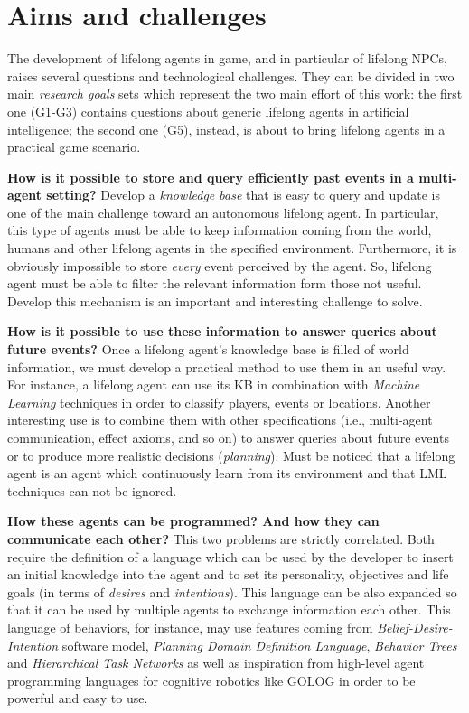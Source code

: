 \section{Aims and challenges}

The development of lifelong agents in game, and in particular of lifelong NPCs, raises several questions and technological challenges. They can be divided in two main \emph{research goals} sets which represent the two main effort of this work: the first one (G1-G3) contains questions about generic lifelong agents in artificial intelligence; the second one (G5), instead, is about to bring lifelong agents in a practical game scenario.

\begin{goals}
\item \textbf{How is it possible to store and query efficiently past events in a multi-agent setting?} Develop a \emph{knowledge base} that is easy to query and update is one of the main challenge toward an autonomous lifelong agent. In particular, this type of agents must be able to keep information coming from the world, humans and other lifelong agents in the specified environment. %
%
Furthermore, it is obviously impossible to store \emph{every} event perceived by the agent. So, lifelong agent must be able to filter the relevant information form those not useful. Develop this mechanism is an important and interesting challenge to solve.
%
% 
\item \textbf{How is it possible to use these information to answer queries about future events?} Once a lifelong agent's knowledge base is filled of world information, we must develop a practical method to use them in an useful way. For instance, a lifelong agent can use its KB in combination with \emph{Machine Learning} techniques in order to classify players, events or locations. Another interesting use is to combine them with other specifications (i.e., multi-agent communication, effect axioms, and so on) to answer queries about future events or to produce more realistic decisions (\emph{planning}). Must be noticed that a lifelong agent is an agent which continuously learn from its environment and that LML techniques can not be ignored. 
%
\item \textbf{How these agents can be programmed? And how they can communicate each other?} This two problems are strictly correlated. Both require the definition of a language which can be used by the developer to insert an initial knowledge into the agent and to set its personality,  objectives and life goals (in terms of \emph{desires} and \emph{intentions}). This language can be also expanded so that it can be used by multiple agents to exchange information each other.  This language of behaviors, for instance, may use features coming from \emph{Belief-Desire-Intention} software model, \emph{Planning Domain Definition Language}, \emph{Behavior Trees} and \emph{Hierarchical Task Networks} as well as inspiration from high-level agent  programming languages for cognitive robotics like GOLOG \cite{levesque1997golog} in order to be powerful and easy to use.

\end{goals}
